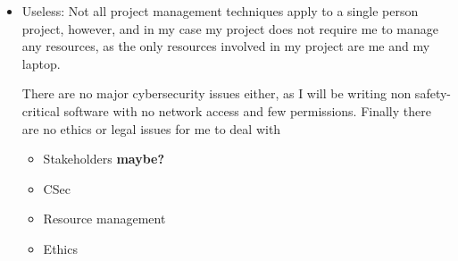 \documentclass[11pt]{article}
\begin{document}
\begin{itemize}
    \item Useless:
    Not all project management techniques apply to a single person project, however, and in my case my project does not require me to manage any resources, as the only resources involved in my project are me and my laptop.

    There are no major cybersecurity issues either, as I will be writing non safety-critical software with no network access and few permissions. Finally there are no ethics or legal issues for me to deal with
\begin{itemize}
    \item Stakeholders \textbf{maybe?}
    \item CSec
    \item Resource management
    \item Ethics
\end{itemize}
\end{itemize}
\end{document}
